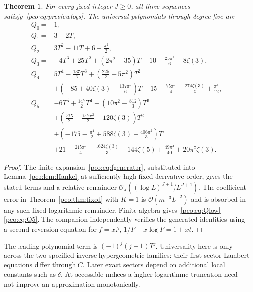 \documentclass[11pt]{article}
\numberwithin{equation}{section}
\newtheorem{theorem}{Theorem}[section]
\theoremstyle{remark}\newtheorem{remark}[theorem]{Remark}
\newcommand{\Oh}{\mathcal O}
\begin{document}
\begin{theorem}\label{peo:thm:logarithms}
For every fixed integer $J\ge0$, all three sequences satisfy~\eqref{peo:eq:previewlogs}. The universal polynomials through degree five are
\begin{align}
 Q_0={}&1,\nonumber\\
 Q_1={}&3-2T,\nonumber\\
 Q_2={}&3T^2-11T+6-\frac{\pi^2}{2},\nonumber\\
 Q_3={}&-4T^3+25T^2+(2\pi^2-35)T
       +10-\frac{25\pi^2}{6}-8\zeta(3),\label{peo:eq:Qlow}\\
 Q_4={}&5T^4-\frac{137}{3}T^3+
       \left(\frac{225}{2}-5\pi^2\right)T^2\nonumber\\
      &+\left(-85+40\zeta(3)+\frac{137\pi^2}{6}\right)T
       +15-\frac{75\pi^2}{4}-\frac{274\zeta(3)}3+\frac{\pi^4}{12},\label{peo:eq:Q4}\\
 Q_5={}&-6T^5+\frac{147}{2}T^4+
       \left(10\pi^2-\frac{812}{3}\right)T^3\nonumber\\
      &+\left(\frac{735}{2}-\frac{147\pi^2}{2}-120\zeta(3)\right)T^2\nonumber\\
      &+\left(-175-\frac{\pi^4}{2}+588\zeta(3)+\frac{406\pi^2}{3}\right)T\nonumber\\
      &+21-\frac{245\pi^2}{4}-\frac{1624\zeta(3)}{3}
       -144\zeta(5)+\frac{49\pi^4}{40}+20\pi^2\zeta(3).
       \label{peo:eq:Q5}
\end{align}
\end{theorem}
\begin{proof}
The finite expansion~\eqref{peo:eq:fgenerator}, substituted into Lemma~\ref{peo:lem:Hankel} at sufficiently high fixed derivative order, gives the stated terms and a relative remainder $\Oh_J((\log L)^{J+1}/L^{J+1})$. The coefficient error in Theorem~\ref{peo:thm:fixed} with $K=1$ is $\Oh(m^{-3}L^{-2})$ and is absorbed in any such fixed logarithmic remainder. Finite algebra gives~\eqref{peo:eq:Qlow}--\eqref{peo:eq:Q5}. The companion independently verifies the generated identities using a second reversion equation for $f=xF$,
$1/F+x\log F=1+xt$.
\end{proof}
The leading polynomial term is $(-1)^j(j+1)T^j$. Universality here is only across the two specified inverse hypergeometric families: their first-sector Lambert equations differ through $C$. Later exact sectors depend on additional local constants such as $\delta$. At accessible indices a higher logarithmic truncation need not improve an approximation monotonically.
\end{document}
